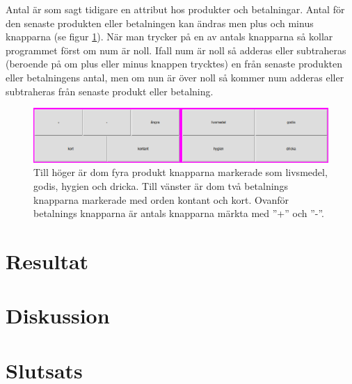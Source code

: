 \documentclass[a4paper, 12pt]{article}
\begin{document}
Antal är som sagt tidigare en attribut hos produkter och betalningar. Antal för den senaste produkten eller betalningen kan ändras men plus och minus knapparna (se figur \ref{fig:3alt}).
När man trycker på en av antals knapparna så kollar programmet först om num är noll. Ifall num är noll så adderas eller subtraheras (beroende på om plus eller minus knappen trycktes) en från senaste produkten eller betalningens antal, men om nun är över noll så kommer num adderas eller subtraheras från senaste produkt eller betalning. 

\begin{figure}[h!]
  \includegraphics[width=\linewidth]{img/3alt.png}
  \caption{
	  Till höger är dom fyra produkt knapparna markerade som livsmedel, godis, hygien och dricka.
	  Till vänster är dom två betalnings knapparna markerade med orden kontant och kort.
	  Ovanför betalnings knapparna är antals knapparna märkta med ''+'' och ''-''.
	}
  \label{fig:3alt}
\end{figure}



\section{Resultat}

\section{Diskussion}

\section{Slutsats}

\newpage 

%

\printbibliography
\end{document}

